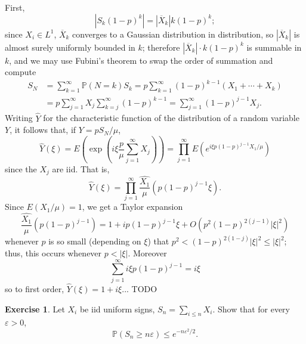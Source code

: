\documentclass[10pt]{article}
\newcommand{\PP}{\mathbb P}
\theoremstyle{definition}
\newtheorem{exer}{Exercise}
\begin{document}
First,
$$|S_k(1-p)^k| = |\overline X_k| k(1-p)^k;$$
since $X_i \in L^1$, $\overline X_k$ converges to a Gaussian distribution in distribution, so $|\overline X_k|$ is almost surely uniformly bounded in $k$; therefore $|\overline X_k|\cdot k(1-p)^k$ is summable in $k$, and we may use Fubini's theorem to swap the order of summation and compute
\begin{align*}
S_N &= \sum_{k=1}^\infty \PP(N = k) S_k
= p\sum_{k=1}^\infty (1-p)^{k-1}(X_1 + \cdots + X_k)\\
&= p \sum_{j=1}^\infty X_j \sum_{k=j}^\infty (1-p)^{k-1}
= \sum_{j=1}^\infty (1-p)^{j-1} X_j.
\end{align*}
Writing $\hat Y$ for the characteristic function of the distribution of a random variable $Y$, it follows that, if $Y = pS_N/\mu$,
$$
\hat Y(\xi) = E\left(\exp\left(i\xi\frac{p}{\mu}\sum_{j=1}^\infty X_j\right)\right)
= \prod_{j=1}^\infty E(e^{i\xi p(1-p)^{j-1}X_1/\mu})
$$
since the $X_j$ are iid. That is,
$$\hat Y(\xi) = \prod_{j=1}^\infty \widehat{\frac{X_1}{\mu}}(p(1-p)^{j-1}\xi).$$
Since $E(X_1/\mu) = 1$, we get a Taylor expansion
$$\widehat{\frac{X_1}{\mu}}(p(1-p)^{j-1}) = 1 + ip(1-p)^{j-1}\xi + O(p^2(1-p)^{2(j-1)}|\xi|^2)$$
whenever $p$ is so small (depending on $\xi$) that $p^2 < (1-p)^{2(1-j)}|\xi|^2 \leq |\xi|^2$; thus, this occurs whenever $p < |\xi|$.
Moreover
$$\sum_{j=1}^\infty i\xi p(1-p)^{j-1} = i\xi$$
so to first order, $\hat Y(\xi) = 1 + i\xi$... TODO

\begin{exer}
Let $X_i$ be iid uniform signs, $S_n = \sum_{i \leq n} X_i$. Show that for every $\varepsilon > 0$,
$$\PP(S_n \geq n\varepsilon) \leq e^{-n\varepsilon^2/2}.$$
\end{exer}
\end{document}
